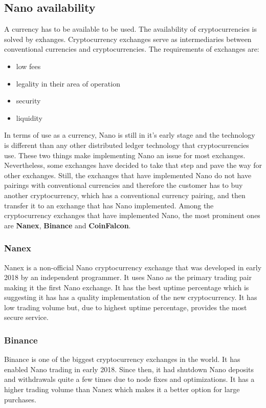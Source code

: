 \documentclass{ferseminar}
\begin{document}
\subsection{Nano availability}

A currency has to be available to be used. The availability of cryptocurrencies is solved by exhanges. Cryptocurrency exchanges serve as intermediaries between conventional currencies and cryptocurrencies. The requirements of exchanges are:
\begin{itemize}
	\item low fees
	\item legality in their area of operation
	\item security
	\item liquidity
\end{itemize}

In terms of use as a currency, Nano is still in it's early stage and the technology is different than any other distributed ledger technology that cryptocurrencies use. These two things make implementing Nano an issue for most exchanges. Nevertheless, some exchanges have decided to take that step and pave the way for other exchanges. Still, the exchanges that have implemented Nano do not have pairings with conventional currencies and therefore the customer has to buy another cryptocurrency, which has a conventional currency pairing, and then transfer it to an exchange that has Nano implemented. Among the cryptocurrency exchanges that have implemented Nano, the most prominent ones are \textbf{Nanex}, \textbf{Binance} and \textbf{CoinFalcon}.

\subsubsection{Nanex}
Nanex is a non-official Nano cryptocurrency exchange that was developed in early 2018 by an independent programmer. It uses Nano as the primary trading pair making it the first Nano exchange. It has the best uptime percentage which is suggesting it has has a quality implementation of the new cryptocurrency. It has low trading volume but, due to highest uptime percentage, provides the most secure service.

\subsubsection{Binance}
Binance is one of the biggest cryptocurrency exchanges in the world. It has enabled Nano trading in early 2018. Since then, it had shutdown Nano deposits and withdrawals quite a few times due to node fixes and optimizations. It has a higher trading volume than Nanex which makes it a better option for large purchases.
\end{document}
